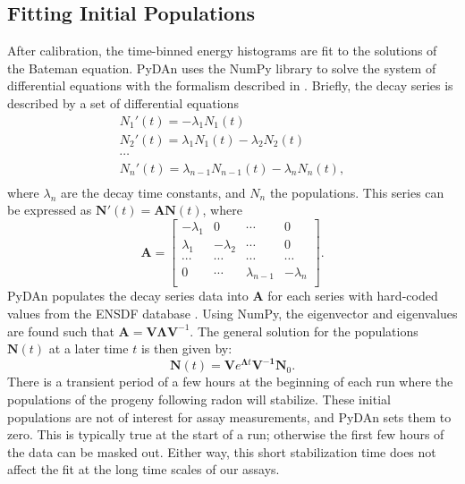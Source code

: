 \documentclass[final,3p,times]{elsarticle}
\newcommand{\matr}[1]{\mathbf{#1}}
\begin{document}
\subsection{Fitting Initial Populations}
\label{sec:fit_populations}
After calibration, the time-binned energy histograms are fit to the solutions of the Bateman equation.
PyDAn uses the NumPy library \cite{numpy} to solve the system of differential equations with the formalism described in \cite{Levy2018}.
Briefly, the decay series is described by a set of differential equations 
\begin{equation}
\begin{split}
N_1'(t) = -\lambda_1 N_1(t) \\
N_2'(t) = \lambda_1 N_1(t) -\lambda_2 N_2(t) \\
\cdots \\
N_n'(t) = \lambda_{n-1} N_{n-1}(t) -\lambda_n N_n(t), \\
\end{split}
\end{equation}
where $\lambda_{n}$ are the decay time constants, and $N_n$ the populations.
This series can be expressed as $\matr{N}'(t) = \matr{A} \matr{N}(t)$, where
\[
\matr{A} = 
\begin{bmatrix}
-\lambda_1 & 0 & \cdots & 0 \\
\lambda_1 & -\lambda_2 & \cdots & 0 \\
\cdots & \cdots & \cdots & \cdots \\
0 & \cdots & \lambda_{n-1} & -\lambda_{n} \\
\end{bmatrix} .
\]
PyDAn populates the decay series data into $\matr{A}$ for each series with hard-coded values from the ENSDF database \cite{ensdf}.
Using NumPy, the eigenvector and eigenvalues are found such that $\matr{A} = \matr{V} \matr{\Lambda} \matr{V}^{-1}$.
The general solution for the populations $\matr{N}(t)$ at a later time $t$ is then given by:
\begin{equation}
\label{eq:N}
\matr{N}(t) = \matr{V} e^{\matr{\Lambda}t} \matr{V^{-1}} \matr{N}_0 .
\end{equation}
There is a transient period of a few hours at the beginning of each run where the populations of the progeny following radon will stabilize. 
These initial populations are not of interest for assay measurements, and PyDAn sets them to zero. This is typically true at the start of a run; otherwise the first few hours of the data can be masked out. 
Either way, this short stabilization time does not affect the fit at the long time scales of our assays. 
\end{document}
